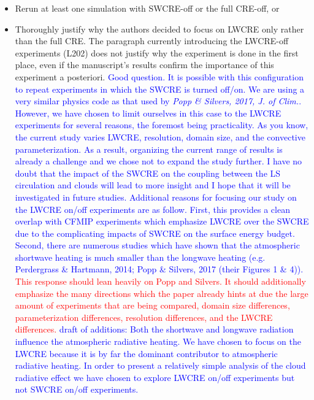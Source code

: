 \documentclass[draft]{agujournal2019}
\begin{document}
\begin{itemize}
  \item Rerun at least one simulation with SWCRE-off or the full CRE-off, or
  \item Thoroughly justify why the authors decided to focus on LWCRE only rather than the full CRE. The paragraph
currently introducing the LWCRE-off experiments (L202) does not justify why the experiment is done in the first
place, even if the manuscript’s results confirm the importance of this experiment a posteriori.
\textcolor{blue}{Good question.  It is possible with this configuration to repeat experiments in which the SWCRE is turned off/on.  
We are using a very similar physics code as that used by \textit{Popp \& Silvers, 2017, J. of Clim.}.   However, we have chosen to limit ourselves in this case to the 
LWCRE experiments for several reasons, the foremost being practicality.  As you know, the current study varies LWCRE, resolution, domain size, and 
the convective parameterization.  As a result, organizing the current range of results is already a challenge and we chose not to 
expand the study further.  I have no doubt that the impact of the SWCRE on the coupling between the LS circulation and clouds will lead 
to more insight and I hope that it will be investigated in future studies.  Additional reasons for focusing our study on the LWCRE on/off experiments
are as follow.  First, this provides a clean overlap with CFMIP experiments which emphasize LWCRE over the SWCRE due to the complicating impacts of
SWCRE on the surface energy budget.  Second, there are numerous studies which have shown that the atmospheric shortwave heating is 
much smaller than the longwave heating (e.g. Perdergrass \& Hartmann, 2014; Popp \& Silvers, 2017 (their Figures 1 \& 4)).}
\textcolor{red}{This response should lean heavily on Popp and Silvers.  It should additionally emphasize the many directions which the paper already hints at due the large amount of experiments that are being compared, domain size differences, 
parameterization differences, resolution differences, and the LWCRE differences.}
\textcolor{blue}{draft of additions: Both the shortwave and longwave radiation influence the atmospheric radiative heating.  We have chosen to focus on 
the LWCRE because it is by far the dominant contributor to atmospheric radiative heating.
In order to present a relatively simple analysis of the cloud radiative effect we have chosen to explore LWCRE on/off experiments but not SWCRE on/off 
experiments.  }
\end{itemize}
\end{document}
